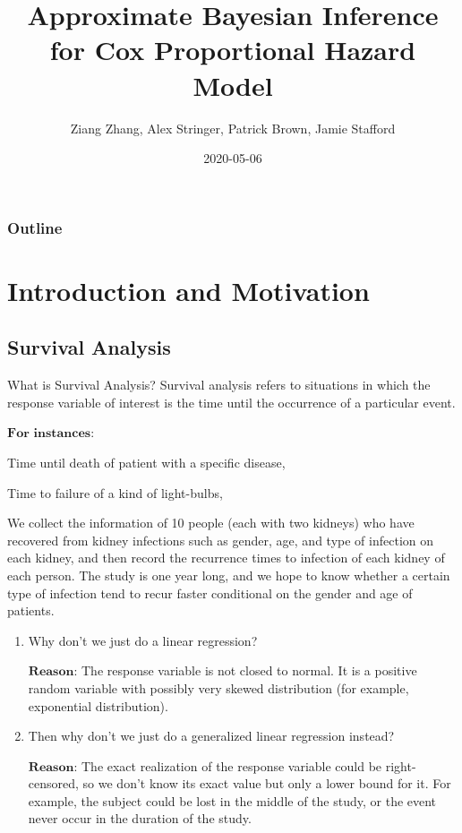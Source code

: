 \documentclass{beamer} %
\title{Approximate Bayesian Inference for Cox Proportional Hazard Model}
\author{Ziang Zhang, Alex Stringer, Patrick Brown, Jamie Stafford}
\institute{Department of Statistics, University of Toronto}
\date{2020-05-06}
\begin{document}
\begin{frame}
\titlepage
\end{frame}

\begin{frame}
\frametitle{Outline}
\tableofcontents
\end{frame}

\section{Introduction and Motivation}
\subsection{Survival Analysis}
\begin{frame}
\begin{block}{What is Survival Analysis?}
Survival analysis refers to situations in which the response variable of interest is the time until the occurrence of a particular event.
\end{block}
\pause

$\textbf{For instances: }$
\pause

Time until death of patient with a specific disease, 

\pause
Time to failure of a kind of light-bulbs, 
\end{frame}

\begin{frame}
\begin{Example}
We collect the information of 10 people (each with two kidneys) who have recovered from kidney infections such as gender, age, and type of infection on each kidney, and then record the recurrence times to infection of each kidney of each person. The study is one year long, and we hope to know whether a certain type of infection tend to recur faster conditional on the gender and age of patients.
\end{Example}
\end{frame}

\begin{frame}
\begin{enumerate}
\item Why don't we just do a linear regression? 
\pause 

$\textbf{Reason}$: The response variable is not closed to normal. It is a positive random variable with possibly very skewed distribution (for example, exponential distribution).

\pause 
\item Then why don't we just do a generalized linear regression instead?

\pause 
$\textbf{Reason}$: The exact realization of the response variable could be right-censored, so we don't know its exact value but only a lower bound for it. For example, the subject could be lost in the middle of the study, or the event never occur in the duration of the study.

\end{enumerate}
\end{frame}
\end{document}
